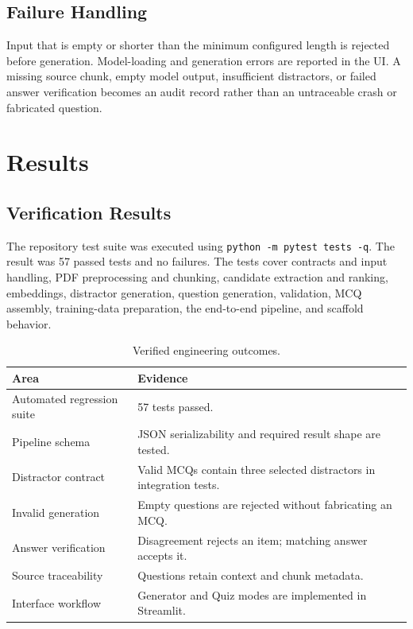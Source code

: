 \documentclass[12pt,a4paper]{report}
\newcommand{\code}[1]{\texttt{#1}}
\begin{document}
\section{Failure Handling}
Input that is empty or shorter than the minimum configured length is rejected before generation. Model-loading and generation errors are reported in the UI. A missing source chunk, empty model output, insufficient distractors, or failed answer verification becomes an audit record rather than an untraceable crash or fabricated question.

\clearpage
\chapter{Results}
\section{Verification Results}
The repository test suite was executed using \code{python -m pytest tests -q}. The result was 57 passed tests and no failures. The tests cover contracts and input handling, PDF preprocessing and chunking, candidate extraction and ranking, embeddings, distractor generation, question generation, validation, MCQ assembly, training-data preparation, the end-to-end pipeline, and scaffold behavior.

\begin{table}[H]
\centering
\caption{Verified engineering outcomes.}
\begin{tabular}{p{}p{}}
\toprule
\textbf{Area} & \textbf{Evidence}\\
\midrule
Automated regression suite & 57 tests passed.\\
Pipeline schema & JSON serializability and required result shape are tested.\\
Distractor contract & Valid MCQs contain three selected distractors in integration tests.\\
Invalid generation & Empty questions are rejected without fabricating an MCQ.\\
Answer verification & Disagreement rejects an item; matching answer accepts it.\\
Source traceability & Questions retain context and chunk metadata.\\
Interface workflow & Generator and Quiz modes are implemented in Streamlit.\\
\bottomrule
\end{tabular}
\end{table}
\end{document}
